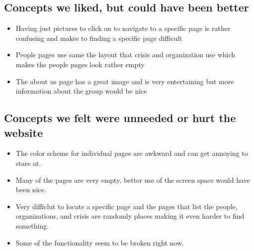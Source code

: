 \documentclass[12pt]{report}
\begin{document}
\subsection*{Concepts we liked, but could have been better}
\hfill \newline

\begin{itemize}
\item Having just pictures to click on to navigate to a specific page is rather confusing and makes to finding a specific page difficult
\item People pages use same the layout that crisis and organization use which makes the people pages look rather empty
\item The about us page has a great image and is very entertaining but more information about the group would be nice
\end{itemize}

\subsection*{Concepts we felt were unneeded or hurt the website}
\hfill \newline

\begin{itemize}
\item The color scheme for individual pages are awkward and can get annoying to stare at.
\item Many of the pages are very empty, better use of the screen space would have been nice.
\item Very difficlut to locate a specific page and the pages that list the people, organizations, and crisis are randomly places making it even harder to find something.
\item Some of the functionality seem to be broken right now.
\end{itemize}
\end{document}
